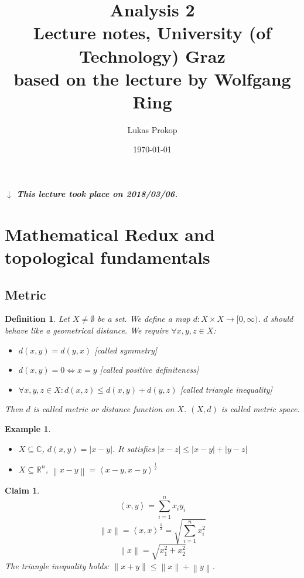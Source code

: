 \documentclass{article}
\title{
  Analysis 2 \\
  \large{Lecture notes, University (of Technology) Graz} \\
  based on the lecture by Wolfgang Ring
}
\date{\today}
\author{Lukas Prokop}
\newtheorem{example}{Example}  \numberwithin{example}{section}
\newtheorem{definition}{Definition}  \numberwithin{definition}{section}
\newtheorem*{claim}{Claim}%
\newcommand{\angel}[1]{\left\langle#1\right\rangle}
\newcommand{\norm}[1]{\left\|#1\right\|}
\newcommand{\card}[1]{\left|#1\right|}
\newcommand{\dateref}[1]{%
  \begin{mdframed}[backgroundcolor=gray!10,innerbottommargin=0pt,innertopmargin=0pt]
    \paragraph{\textit{$\downarrow$ This lecture took place on #1.}}%
  \end{mdframed}%
}
\begin{document}
\maketitle
\tableofcontents
\clearpage

\dateref{2018/03/06}

\section{Mathematical Redux and topological fundamentals}
\subsection{Metric}

\begin{definition}
  Let $X \neq \emptyset$ be a set. We define a map $d: X \times X \to [0,\infty)$.
  $d$ should behave like a geometrical distance. We require $\forall x, y, z \in X$:
  \begin{itemize}
    \item $d(x, y) = d(y, x)$ [called \emph{symmetry}]
    \item $d(x, y) = 0 \iff x = y$ [called \emph{positive definiteness}]
    \item $\forall x,y,z \in X: d(x, z) \leq d(x, y) + d(y, z)$ [called \emph{triangle inequality}]
  \end{itemize}
  Then $d$ is called \emph{metric} or \emph{distance function} on $X$.
  $(X, d)$ is called \emph{metric space}.
\end{definition}

\begin{example}
  \begin{itemize}\hfill{}
    \item $X \subseteq \mathbb C$, $d(x, y) = \card{x - y}$.
          It satisfies $\card{x - z} \leq \card{x - y} + \card{y - z}$
    \item $X \subseteq \mathbb R^n$, $\norm{x - y} = \angel{x - y, x - y}^{\frac12}$
  \end{itemize}
\end{example}

\begin{claim}
  \[ \angel{x, y} = \sum_{i=1}^n x_i y_i \]
  \[ \norm{x} = \angel{x,x}^{\frac12} = \sqrt{\sum_{i=1}^n x_i^2} \]
  \[ \norm{x} = \sqrt{x_1^2 + x_2^2} \]
  The triangle inequality holds: $\norm{x+y} \leq \norm{x} + \norm{y}$.
\end{claim}
\end{document}
